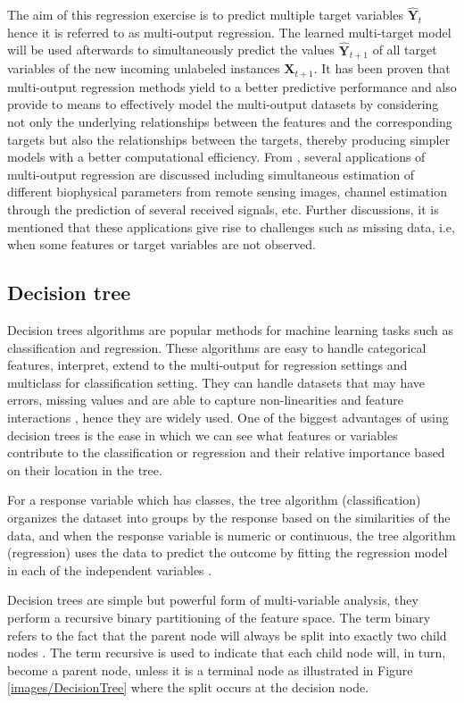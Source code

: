 The aim of this regression exercise is to predict multiple target variables $\widehat{\textbf{Y}}_{t}$  hence it is referred to as multi-output regression. The learned multi-target model will be used afterwards to simultaneously predict the values $\widehat{\textbf{Y}}_{t+1}$  of all target variables of the new incoming unlabeled instances $\textbf{X}_{t+1}$.  It has been proven that multi-output regression methods yield to a better predictive performance and also provide to means to effectively
model the multi-output datasets by considering not only the underlying relationships
between the features and the corresponding targets but also the relationships between
the targets, thereby producing simpler models with a better computational efficiency. From \citep{borchani2015survey}, several applications of multi-output regression are discussed including simultaneous estimation of different biophysical parameters from remote sensing images, channel estimation through the prediction of several received signals, etc. Further discussions, it is mentioned that these applications give rise to challenges such as missing data, i.e, when some features or target variables are not observed.

\subsection{Decision tree}
\label{Dt}
Decision trees algorithms are popular methods for machine learning tasks such as classification and regression. These algorithms are easy to handle categorical features, interpret, extend to the multi-output for regression settings and multiclass for classification setting. They can handle datasets that may have errors, missing values and are able to capture non-linearities and feature interactions \citep{DT}, hence they are widely used. One of the biggest advantages of using decision trees is the ease in which we can see what features or variables contribute to the classification or regression and their relative importance based on their location in the tree.

For a response variable which
has classes, the tree algorithm (classification) organizes the dataset into groups by the response based on the similarities of the data, and when the response variable is numeric or continuous, the tree algorithm (regression) uses the data to predict the outcome by fitting the regression model in each of the independent variables \citep{morgan2014classification}.

Decision trees are simple but powerful form of multi-variable analysis, they  perform a recursive binary partitioning of the feature space. The term binary refers to the fact that the parent node  will always be split into exactly two child nodes \citep{moisen2008classification}. The term recursive is used to indicate that each child node will, in turn, become a parent node, unless it is a terminal node as illustrated in Figure \ref{images/DecisionTree} where the split occurs at the decision node.  

